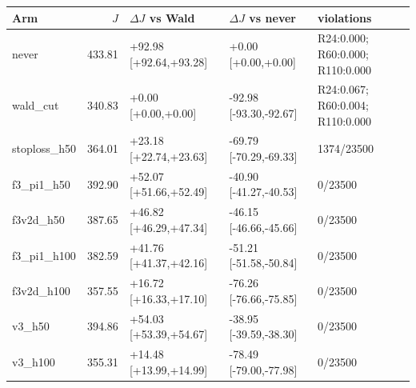 \begin{tabular}{@{}l r l l l@{}}
\toprule
Arm & $J$ & $\Delta J$ vs Wald & $\Delta J$ vs never & violations \\
\midrule
never & 433.81 & +92.98 [+92.64,+93.28] & +0.00 [+0.00,+0.00] & R24:0.000; R60:0.000; R110:0.000 \\
wald\_cut & 340.83 & +0.00 [+0.00,+0.00] & -92.98 [-93.30,-92.67] & R24:0.067; R60:0.004; R110:0.000 \\
stoploss\_h50 & 364.01 & +23.18 [+22.74,+23.63] & -69.79 [-70.29,-69.33] & 1374/23500 \\
f3\_pi1\_h50 & 392.90 & +52.07 [+51.66,+52.49] & -40.90 [-41.27,-40.53] & 0/23500 \\
f3v2d\_h50 & 387.65 & +46.82 [+46.29,+47.34] & -46.15 [-46.66,-45.66] & 0/23500 \\
f3\_pi1\_h100 & 382.59 & +41.76 [+41.37,+42.16] & -51.21 [-51.58,-50.84] & 0/23500 \\
f3v2d\_h100 & 357.55 & +16.72 [+16.33,+17.10] & -76.26 [-76.66,-75.85] & 0/23500 \\
v3\_h50 & 394.86 & +54.03 [+53.39,+54.67] & -38.95 [-39.59,-38.30] & 0/23500 \\
v3\_h100 & 355.31 & +14.48 [+13.99,+14.99] & -78.49 [-79.00,-77.98] & 0/23500 \\
\bottomrule
\end{tabular}
